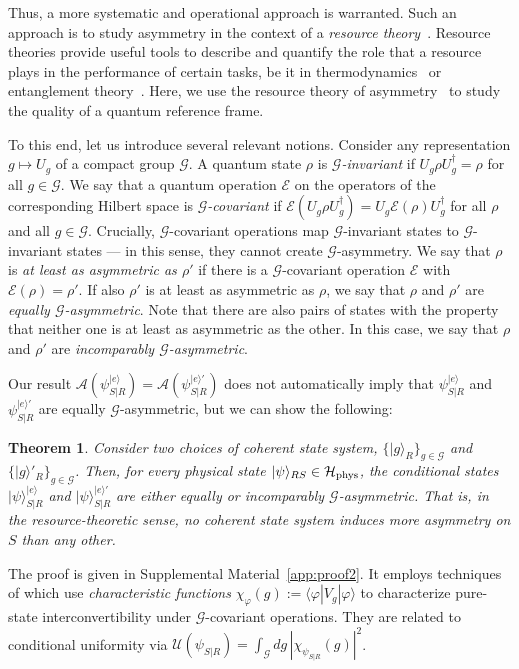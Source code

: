 \documentclass[aps,10pt,twocolumn,showpacs,pra,citeautoscript,amsmath,amssymb,floatfix,superscriptaddress]{revtex4-1}
\newtheorem{theorem}{Theorem}
\begin{document}
Thus, a more systematic and operational approach is warranted. Such an approach is to study asymmetry in the context of a \emph{resource theory}~\cite{ChitambarGour}. Resource theories provide useful tools to describe and quantify the role that a resource plays in the performance of certain tasks, be it in thermodynamics~\cite{Brandao} or entanglement theory~\cite{Vedral}. Here, we use the resource theory of asymmetry~\cite{Marvian,MarvianSpekkens} to study the quality of a quantum reference frame.

To this end, let us introduce several relevant notions. Consider any representation $g\mapsto U_g$ of a compact group $\mathcal{G}$. A quantum state $\rho$ is \emph{$\mathcal{G}$-invariant} if $U_g\rho U_g^\dagger = \rho$ for all $g\in\mathcal{G}$. We say that a quantum operation $\mathcal{E}$ on the operators of the corresponding Hilbert space is \emph{$\mathcal{G}$-covariant} if $\mathcal{E}(U_g \rho U_g^\dagger)=U_g \mathcal{E}(\rho) U_g^\dagger$ for all $\rho$ and all $g\in\mathcal{G}$. Crucially, $\mathcal{G}$-covariant operations map $\mathcal{G}$-invariant states to $\mathcal{G}$-invariant states --- in this sense, they cannot create $\mathcal{G}$-asymmetry. We say that $\rho$ is \emph{at least as asymmetric as $\rho'$} if there is a $\mathcal{G}$-covariant operation $\mathcal{E}$ with $\mathcal{E}(\rho)=\rho'$. If also $\rho'$ is at least as asymmetric as $\rho$, we say that $\rho$ and $\rho'$ are \emph{equally $\mathcal{G}$-asymmetric}. Note that there are also pairs of states with the property that neither one is at least as asymmetric as the other. In this case, we say that $\rho$ and $\rho'$ are \emph{incomparably $\mathcal{G}$-asymmetric}.

Our result $\mathcal{A}(\psi_{S|R}^{|e\rangle})=\mathcal{A}(\psi_{S|R}^{|e\rangle'})$ does not automatically imply that $\psi_{S|R}^{|e\rangle}$ and $\psi_{S|R}^{|e\rangle'}$ are equally $\mathcal{G}$-asymmetric, but we can show the following:
\begin{theorem}
\label{TheResource}
Consider two choices of coherent state system, $\{|g\rangle_R\}_{g\in\mathcal{G}}$ and $\{|g\rangle'_R\}_{g\in\mathcal{G}}$. Then, for every physical state $|\psi\rangle_{RS}\in\mathcal{H}_{\rm phys}$, the conditional states $|\psi\rangle_{S|R}^{|e\rangle}$ and $|\psi\rangle_{S|R}^{|e\rangle'}$ are either equally or incomparably $\mathcal{G}$-asymmetric. That is, in the resource-theoretic sense, no coherent state system induces more asymmetry on $S$ than any other.
\end{theorem}
The proof is given in Supplemental Material~\ref{app:proof2}. It employs techniques of \cite{Marvian,MarvianSpekkens} which use \emph{characteristic functions} $\chi_\varphi(g):=\langle\varphi|V_g|\varphi\rangle$ to characterize pure-state interconvertibility under $\mathcal{G}$-covariant operations. They are related to conditional uniformity via $\mathcal{U}(\psi_{S|R})=\int_{\mathcal{G}}dg\,|\chi_{\psi_{S|R}}(g)|^2$.
\end{document}

